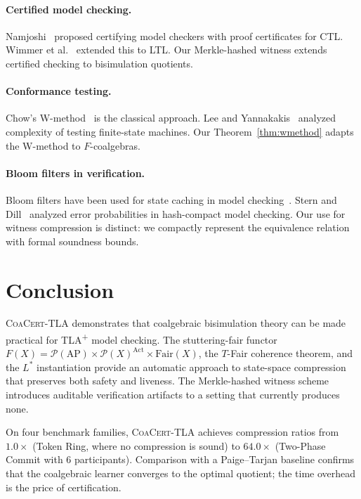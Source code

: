 \documentclass[11pt]{article}
\newcommand{\Pow}{\mathcal{P}}
\newcommand{\Fair}{\ensuremath{\mathrm{Fair}}}
\newcommand{\Act}{\ensuremath{\mathrm{Act}}}
\newcommand{\AP}{\ensuremath{\mathrm{AP}}}
\newcommand{\TFair}{$T$-Fair}
\newcommand{\CoaCert}{\textsc{CoaCert-TLA}}
\newcommand{\TLAplus}{TLA\textsuperscript{+}}
\begin{document}
\paragraph{Certified model checking.}
Namjoshi~\cite{Namjoshi01} proposed certifying model checkers with
proof certificates for CTL.
Wimmer et al.~\cite{WimmerLBR15} extended this to LTL.
Our Merkle-hashed witness extends certified checking to bisimulation
quotients.

\paragraph{Conformance testing.}
Chow's W-method~\cite{Chow78} is the classical approach.
Lee and Yannakakis~\cite{LeeY96} analyzed complexity of testing
finite-state machines.
Our Theorem~\ref{thm:wmethod} adapts the W-method to $F$-coalgebras.

\paragraph{Bloom filters in verification.}
Bloom filters have been used for state caching in model
checking~\cite{Holzmann98}.
Stern and Dill~\cite{SternD95} analyzed error probabilities in
hash-compact model checking.
Our use for witness compression is distinct: we compactly represent the
equivalence relation with formal soundness bounds.

\section{Conclusion}
\label{sec:conclusion}

\CoaCert{} demonstrates that coalgebraic bisimulation theory can be made
practical for \TLAplus{} model checking.
The stuttering-fair functor
$F(X) = \Pow(\AP) \times \Pow(X)^{\Act} \times \Fair(X)$, the \TFair{}
coherence theorem, and the $L^*$ instantiation provide an automatic
approach to state-space compression that preserves both safety and liveness.
The Merkle-hashed witness scheme introduces auditable verification
artifacts to a setting that currently produces none.

On four benchmark families, \CoaCert{} achieves compression ratios from
$1.0\times$ (Token Ring, where no compression is sound) to $64.0\times$
(Two-Phase Commit with 6 participants).
Comparison with a Paige--Tarjan baseline confirms that the coalgebraic
learner converges to the optimal quotient; the time overhead is the price
of certification.
\end{document}
